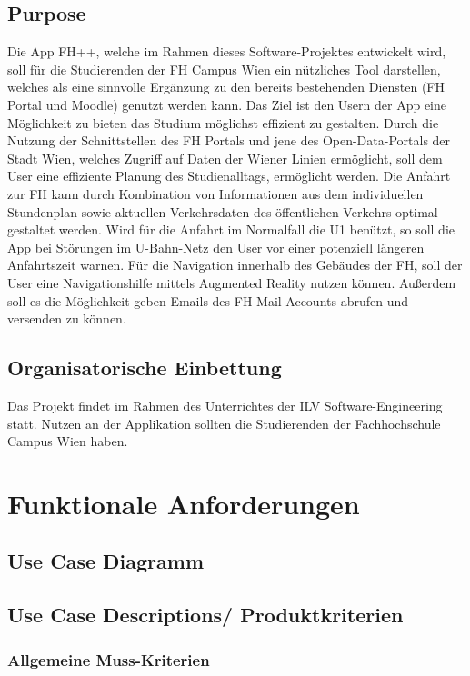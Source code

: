 \documentclass{scrreprt}
\begin{document}
\section{Purpose}
Die App FH++, welche im Rahmen dieses Software-Projektes entwickelt wird, soll für die Studierenden der FH Campus Wien ein nützliches Tool darstellen,
welches als eine sinnvolle Ergänzung zu den bereits bestehenden Diensten (FH Portal und Moodle) genutzt werden kann.
Das Ziel ist den Usern der App eine Möglichkeit zu bieten das Studium möglichst effizient zu gestalten.
Durch die Nutzung der Schnittstellen des FH Portals und jene des Open-Data-Portals der Stadt Wien, welches Zugriff auf Daten der Wiener Linien ermöglicht,
soll dem User eine effiziente Planung des Studienalltags, ermöglicht werden.
Die Anfahrt zur FH kann durch Kombination von Informationen aus dem individuellen Stundenplan sowie aktuellen Verkehrsdaten des öffentlichen Verkehrs 
optimal gestaltet werden. Wird für die Anfahrt im Normalfall die U1 benützt, so soll die App bei Störungen im U-Bahn-Netz den User vor einer potenziell längeren
Anfahrtszeit warnen.
Für die Navigation innerhalb des Gebäudes der FH, soll der User eine Navigationshilfe mittels Augmented Reality nutzen können.   
Außerdem soll es die Möglichkeit geben Emails des FH Mail Accounts abrufen und versenden zu können.

\section{Organisatorische Einbettung}
Das Projekt findet im Rahmen des Unterrichtes der ILV Software-Engineering statt. Nutzen an der Applikation sollten die Studierenden der Fachhochschule Campus Wien haben.

\chapter{Funktionale Anforderungen}

\section{Use Case Diagramm}

\section{Use Case Descriptions/ Produktkriterien}
\subsection{Allgemeine Muss-Kriterien}
\end{document}
